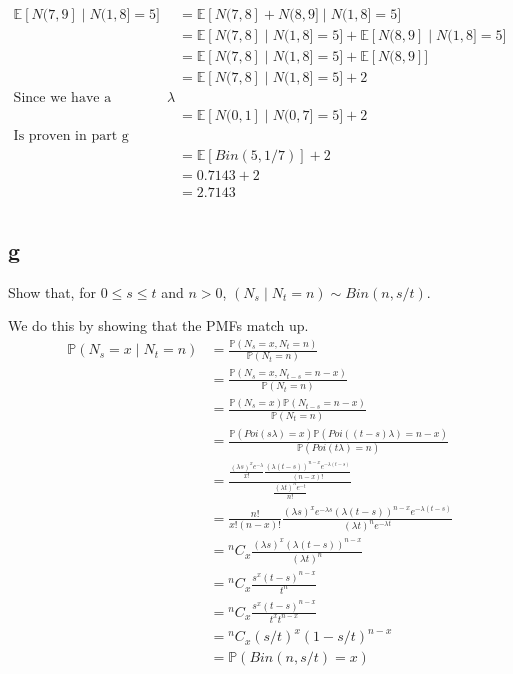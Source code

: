 \documentclass{article}
\newcommand{\prob}{\mathbb{P}}
\newcommand{\expect}{\mathbb{E}}
\begin{document}
\begin{align*}
    \expect[N(7, 9] \;|\; N(1, 8] = 5]
    &= \expect[N(7, 8] + N(8, 9] \;|\; N(1, 8] = 5] \\
    &= \expect[N(7, 8] \;|\; N(1, 8] = 5] + \expect[N(8, 9] \;|\; N(1, 8] = 5] \\
    &= \expect[N(7, 8] \;|\; N(1, 8] = 5] + \expect[N(8, 9]] \\
    &= \expect[N(7, 8] \;|\; N(1, 8] = 5] + 2 \\
    \text{Since we have a constant $\lambda$} \\
    &= \expect[N(0, 1] \;|\; N(0, 7] = 5] + 2 \\
    \text{Is proven in part g} \\
    &= \expect[Bin(5,1/7)] + 2 \\
    &= 0.7143 + 2 \\
    &= 2.7143 \\
\end{align*}

\subsection{g}
Show that, for $0 \leq s \leq t$ and $n > 0$,
$(N_s \;|\; N_t = n) \sim Bin(n, s/t)$.

We do this by showing that the PMFs match up.
\begin{align*}
    \prob(N_s = x \;|\; N_t = n)
    &= \frac{\prob(N_s = x, N_t = n)}{\prob(N_t = n)} \\
    &= \frac{\prob(N_s = x, N_{t-s} = n-x)}{\prob(N_t = n)} \\
    &= \frac{\prob(N_s = x) \prob(N_{t-s} = n-x)}{\prob(N_t = n)} \\
    &= \frac{\prob(Poi(s\lambda) = x) \prob(Poi((t-s)\lambda) = n-x)}{\prob(Poi(t\lambda) = n)} \\
    &= \frac{\frac{(\lambda s)^xe^{-\lambda}}{x!}
    \frac{(\lambda(t-s))^{n-x}e^{-\lambda(t-s)}}{(n-x)!}}
    {\frac{(\lambda t)^ne^{-t}}{n!}} \\
    &= \frac{n!}{x!(n-x)!} \frac{(\lambda s)^xe^{-\lambda s}(\lambda(t-s))^{n-x}e^{-\lambda(t-s)}}
    {(\lambda t)^ne^{-\lambda t}} \\
    &= {}^nC_x \frac{(\lambda s)^x(\lambda(t-s))^{n-x}}{(\lambda t)^n} \\
    &= {}^nC_x \frac{s^x(t-s)^{n-x}}{t^n} \\
    &= {}^nC_x \frac{s^x(t-s)^{n-x}}{t^x t^{n-x}} \\
    &= {}^nC_x (s/t)^x(1-s/t)^{n-x} \\
    &= \prob(Bin(n, s/t) = x) \\
\end{align*}
\end{document}
